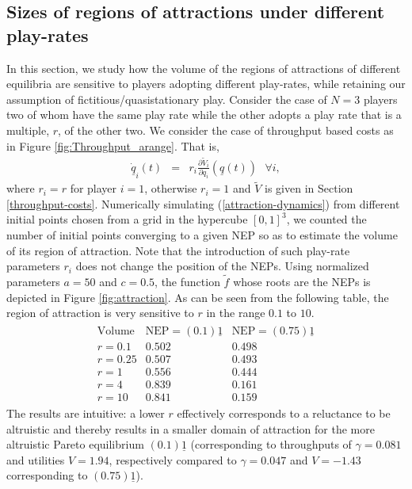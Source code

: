 \documentclass[12pt,onecolumn,draftcls]{IEEEtran}
\newcommand{\uq}{\underline{q}}
\newcommand{\uone}{\underline{1}}
\newcommand{\beqa}{\begin{eqnarray*}}
\newcommand{\eeqa}{\end{eqnarray*}}
\newcommand{\be}{\begin{eqnarray}}
\newcommand{\ee}{\end{eqnarray}}
\begin{document}
\subsection{Sizes of  regions of attractions  under different 
play-rates}\label{asynch-play-numerical}






In this section, we study how the volume of the regions of attractions of
different equilibria are sensitive to players adopting different
play-rates, while retaining our assumption of fictitious/quasistationary
play.  Consider the case of $N=3$ players two of whom have the same play rate
while the other adopts a play rate  that is a multiple, $r$, of the other
two. We consider the case of throughput based costs as in Figure
\ref{fig:Throughput_arange}.  That is, 
\be\label{attraction-dynamics}
\dot{\uq}_i(t) & = & 
r_i\frac{\partial \tilde{V}_i}{\partial q_i}(\uq(t)) 
~~~\forall i,
\ee
where $r_i=r$ for player $i=1$, otherwise $r_i=1$ and $\tilde{V}$ is given
in Section \ref{throughput-costs}.  Numerically simulating
(\ref{attraction-dynamics}) from different initial points  chosen from a
grid in the hypercube $[0,1]^3$, we counted the number of initial points
converging to a given NEP so as to estimate the volume of its region of
attraction.  Note that the introduction of such play-rate parameters $r_i$
does not change the position of the NEPs.  Using normalized parameters
$a=50$ and $c=0.5$, the function $\tilde{f}$ whose roots are the NEPs is
depicted in Figure \ref{fig:attraction}.  As can be seen from the following
table, the region of attraction is very sensitive to $r$ in the range $0.1$
to $10$.
\beqa
\begin{array}{c|c|c|}
\mbox{Volume} & \mbox{NEP}= (0.1)\uone &  \mbox{NEP}= (0.75)\uone \\
\hline
r=0.1 & 0.502  & 0.498 \\ 
r=0.25 & 0.507  & 0.493 \\
r=1 & 0.556 & 0.444 \\
r=4 & 0.839 & 0.161 \\ 
r=10 & 0.841 & 0.159  
\end{array}
\eeqa
The results are intuitive: a lower $r$ effectively corresponds to a
reluctance to be altruistic and thereby results in a smaller domain of
attraction for the more altruistic Pareto equilibrium $(0.1)\uone$
(corresponding to throughputs of $\gamma=0.081$ and utilities $V=1.94$,
respectively compared to $\gamma=0.047$ and $V=-1.43$ corresponding to
$(0.75)\uone$).
\end{document}
